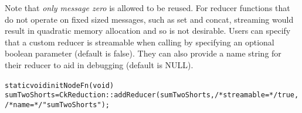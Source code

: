 Note that \emph{only message zero} is allowed to be reused.
For reducer functions that do not operate on fixed sized messages,
such as set and concat, streaming would result in quadratic memory
allocation and so is not desirable. Users can specify that a custom
reducer is streamable when calling  by
specifying an optional boolean parameter (default is false). They can also provide
a name string for their reducer to aid in debugging (default is NULL).

\begin{alltt}
static void initNodeFn(void) {
    sumTwoShorts = CkReduction::addReducer(sumTwoShorts, /* streamable = */ true, /* name = */ "sumTwoShorts");
}
\end{alltt}


